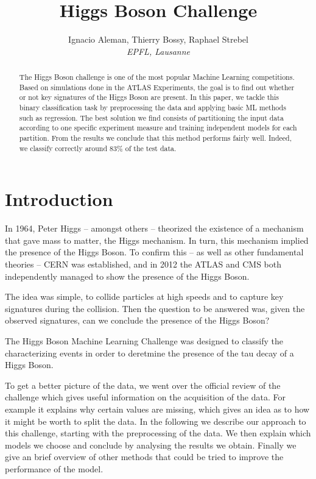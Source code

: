 \documentclass[10pt,conference,compsocconf]{IEEEtran}
\begin{document}
\title{Higgs Boson Challenge}

\author{
  Ignacio Aleman, Thierry Bossy, Raphael Strebel\\
  \textit{EPFL, Lausanne}
}

\maketitle

\begin{abstract}
The Higgs Boson challenge is one of the most popular Machine Learning competitions. Based on simulations done in the ATLAS Experiments, the goal is to find out whether or not key signatures of the Higgs Boson are present. In this paper, we tackle this binary classification task by preprocessing the data and applying basic ML methods such as regression. The best solution we find consists of partitioning the input data according to one specific experiment measure and training independent models for each partition. From the results we conclude that this method performs fairly well. Indeed, we classify correctly around 83\% of the test data.

\end{abstract}

\section{Introduction}

In 1964, Peter Higgs -- amongst others -- theorized the existence of a mechanism that gave mass to matter, the Higgs mechanism. In turn, this mechanism implied the presence of the Higgs Boson. To confirm this -- as well as other fundamental theories -- CERN was established, and in 2012 the ATLAS and CMS both independently managed to show the presence of the Higgs Boson.

The idea was simple, to collide particles at high speeds and to capture key signatures during the collision. Then the question to be answered was, given the observed signatures, can we conclude the presence of the Higgs Boson?

The Higgs Boson Machine Learning Challenge was designed to classify the characterizing events in order to deretmine the presence of the tau decay of a Higgs Boson. 

To get a better picture of the data, we went over the official review of the challenge \cite{higgsPaper} which gives useful information on the acquisition of the data. For example it explains why certain values are missing, which gives an idea as to how it might be worth to split the data. In the following we describe our approach to this challenge, starting with the preprocessing of the data. We then explain which models we choose and conclude by analysing the results we obtain. Finally we give an brief overview of other methods that could be tried to improve the performance of the model.
\end{document}
